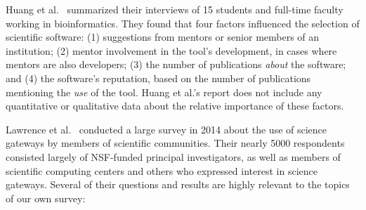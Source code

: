 \documentclass{casicswhitepaper}
\begin{document}
Huang et al.~\cite{huang2013provenance} summarized their interviews of 15 students and full-time faculty working in bioinformatics.  They found that four factors influenced the selection of scientific software: (1) suggestions from mentors or senior members of an institution; (2) mentor involvement in the tool's development, in cases where mentors are also developers; (3) the number of publications \emph{about} the software; and (4) the software's reputation, based on the number of publications mentioning the \emph{use} of the tool.  Huang et al.'s report does not include any quantitative or qualitative data about the relative importance of these factors.

Lawrence et al.~\cite{lawrence2015science, lawrence2014who} conducted a large survey in 2014 about the use of science gateways by members of scientific communities.  Their nearly 5000 respondents consisted largely of NSF-funded principal investigators, as well as members of scientific computing centers and others who expressed interest in science gateways.  Several of their questions and results are highly relevant to the topics of our own survey:
\end{document}
